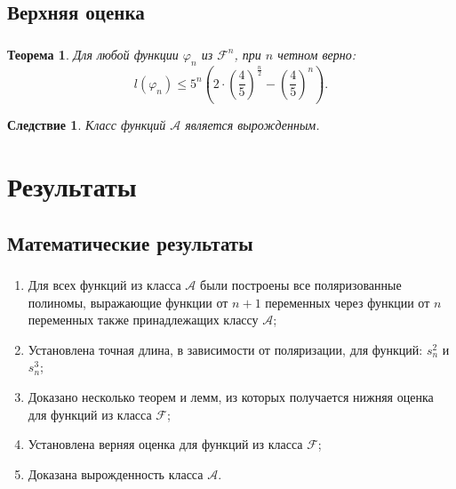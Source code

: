 \documentclass[t]{beamer}
\newtheorem{myth}{Теорема}
\newtheorem*{myco}{Следствие}
\begin{document}
\subsection{Верхняя оценка}
\begin{frame}
\frametitle{\insertsection}
\framesubtitle{\insertsubsection}
 {
\begin{myth}
\label{thh}
Для любой функции $\varphi_n$ из $\mathcal{F}^n$, при $n$ четном верно:
$$ l(\varphi_n) \leqslant 5^n\left(2\cdot\left(\frac{4}{5}\right)^{\frac{n}{2}} -
\left( \frac{4}{5} \right)^n\right).$$
\end{myth}
}
 {
\begin{myco}
Класс функций $\mathcal{A}$ является вырожденным.
\end{myco}
}
\end{frame}

\section{Результаты}
\subsection{Математические результаты}
\begin{frame}
\frametitle{\insertsection}
\framesubtitle{\insertsubsection}
\begin{enumerate}
\item Для всех функций из класса $\mathcal{A}$ были построены все поляризованные
полиномы, выражающие функции от $n+1$ переменных через функции от $n$ переменных также принадлежащих
классу $\mathcal{A}$;
\item<2-> Установлена точная длина, в зависимости от поляризации, для функций: $s^2_n$ и $s^3_n$;
\item<3-> Доказано несколько теорем и лемм, из которых получается нижняя оценка для функций из
класса $\mathcal{F}$;
\item<4-> Установлена верняя оценка для функций из класса $\mathcal{F}$;
\item<5-> Доказана вырожденность класса $\mathcal{A}$.
\end{enumerate}
\end{frame}
\end{document}
